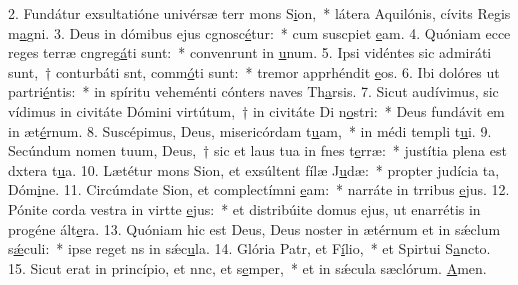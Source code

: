 2. Fundátur exsultatióne univérsæ terr mons S\uline{i}on,~* látera Aquilónis, cívits Regis m\uline{a}gni.
3. Deus in dómibus ejus cgnosc\uline{é}tur:~* cum suscpiet \uline{e}am.
4. Quóniam ecce reges terræ cngreg\uline{á}ti sunt:~* convenrunt in \uline{u}num.
5. Ipsi vidéntes sic admiráti sunt,~† conturbáti snt, comm\uline{ó}ti sunt:~* tremor apprhéndit \uline{e}os.
6. Ibi dolóres ut partri\uline{é}ntis:~* in spíritu veheménti cónters naves Th\uline{a}rsis.
7. Sicut audívimus, sic vídimus in civitáte Dómini virtútum,~† in civitáte Di n\uline{o}stri:~* Deus fundávit em in æt\uline{é}rnum.
8. Suscépimus, Deus, misericórdam t\uline{u}am,~* in médi templi t\uline{u}i.
9. Secúndum nomen tuum, Deus,~† sic et laus tua in fnes t\uline{e}rræ:~* justítia plena est dxtera t\uline{u}a.
10. Lætétur mons Sion, et exsúltent fílæ J\uline{u}dæ:~* propter judícia ta, Dóm\uline{i}ne.
11. Circúmdate Sion, et complectímni \uline{e}am:~* narráte in trribus \uline{e}jus.
12. Pónite corda vestra in virtte \uline{e}jus:~* et distribúite domus ejus, ut enarrétis in progéne ált\uline{e}ra.
13. Quóniam hic est Deus, Deus noster in ætérnum et in sǽclum s\uline{ǽ}culi:~* ipse reget ns in sǽc\uline{u}la.
14. Glória Patr, et F\uline{í}lio,~* et Spirtui S\uline{a}ncto.
15. Sicut erat in princípio, et nnc, et s\uline{e}mper,~* et in sǽcula sæclórum. \uline{A}men.
